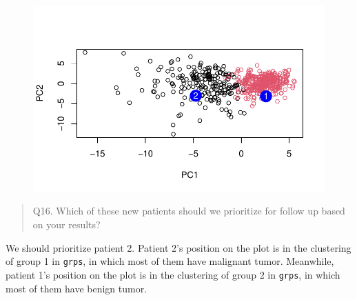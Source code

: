 \documentclass[
  letterpaper,
  DIV=11,
  numbers=noendperiod]{scrartcl}
\newenvironment{Shaded}{\begin{snugshade}}{\end{snugshade}}
\newcommand{\AttributeTok}[1]{\textcolor[rgb]{0.40,0.45,0.13}{#1}}
\newcommand{\DecValTok}[1]{\textcolor[rgb]{0.68,0.00,0.00}{#1}}
\newcommand{\FunctionTok}[1]{\textcolor[rgb]{0.28,0.35,0.67}{#1}}
\newcommand{\NormalTok}[1]{\textcolor[rgb]{0.00,0.23,0.31}{#1}}
\newcommand{\SpecialCharTok}[1]{\textcolor[rgb]{0.37,0.37,0.37}{#1}}
\newcommand{\StringTok}[1]{\textcolor[rgb]{0.13,0.47,0.30}{#1}}
\begin{document}
\begin{Shaded}
\end{Shaded}

\begin{figure}[H]

{\centering \includegraphics{class08_files/figure-pdf/unnamed-chunk-19-1.pdf}

}

\end{figure}

\begin{quote}
Q16. Which of these new patients should we prioritize for follow up
based on your results?
\end{quote}

We should prioritize patient 2. Patient 2's position on the plot is in
the clustering of group 1 in \texttt{grps}, in which most of them have
malignant tumor. Meanwhile, patient 1's position on the plot is in the
clustering of group 2 in \texttt{grps}, in which most of them have
benign tumor.
\end{document}

